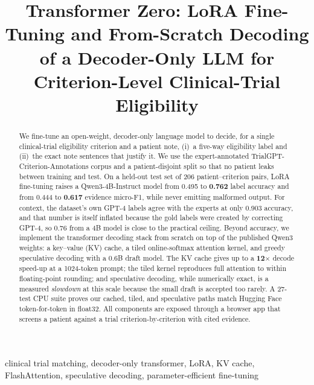 \documentclass[conference]{IEEEtran}
\begin{document}
\title{Transformer Zero: LoRA Fine-Tuning and From-Scratch Decoding of a
Decoder-Only LLM for Criterion-Level Clinical-Trial Eligibility}

\author{
}

\maketitle

\begin{abstract}
We fine-tune an open-weight, decoder-only language model to decide, for a single
clinical-trial eligibility criterion and a patient note, (i)~a five-way
eligibility label and (ii)~the exact note sentences that justify it. We use the
expert-annotated TrialGPT-Criterion-Annotations corpus and a patient-disjoint
split so that no patient leaks between training and test. On a held-out test set
of 206 patient--criterion pairs, LoRA fine-tuning raises a Qwen3-4B-Instruct
model from 0.495 to \textbf{0.762} label accuracy and from 0.444 to
\textbf{0.617} evidence micro-F1, while never emitting malformed output. For
context, the dataset's own GPT-4 labels agree with the experts at only 0.903
accuracy, and that number is itself inflated because the gold labels were created
by correcting GPT-4, so 0.76 from a 4B model is close to the practical ceiling.
Beyond accuracy, we implement the transformer decoding stack from scratch on top
of the published Qwen3 weights: a key--value (KV) cache, a tiled online-softmax
attention kernel, and greedy speculative decoding with a 0.6B draft model. The
KV cache gives up to a \textbf{12$\times$} decode speed-up at a 1024-token
prompt; the tiled kernel reproduces full attention to within floating-point
rounding; and speculative decoding, while numerically exact, is a measured
\emph{slowdown} at this scale because the small draft is accepted too rarely. A
27-test CPU suite proves our cached, tiled, and speculative paths match Hugging
Face token-for-token in float32. All components are exposed through a browser
app that screens a patient against a trial criterion-by-criterion with cited
evidence.
\end{abstract}

\begin{IEEEkeywords}
clinical trial matching, decoder-only transformer, LoRA, KV cache, FlashAttention,
speculative decoding, parameter-efficient fine-tuning
\end{IEEEkeywords}
\end{document}
